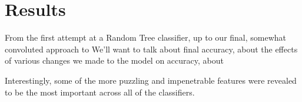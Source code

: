 \section{Results}
\label{sec:-res}
From the first attempt at a Random Tree classifier, up to our final, 
somewhat convoluted approach to 
We'll want to talk about final accuracy, about the effects of various changes 
we made to the model on accuracy, about  

Interestingly, some of the more puzzling and impenetrable features 
were revealed to be the most important across all of the classifiers.

